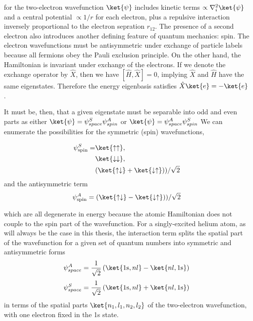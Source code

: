 	\noindent for the two-electron wavefunction $\ket{\psi}$ includes kinetic terms $\propto\nabla_i^2\ket{\psi}$ and a central potential $\propto 1/r$ for each electron, plus a repulsive interaction inversely proportional to the electron sepration $r_{12}$.
	The presence of a second electron also introduces another defining feature of quantum mechanics: spin.
	The electron wavefunctions must be antisymmetric under exchange of particle labels because all fermions obey the Pauli exclusion principle.
	On the other hand, the Hamiltonian is invariant under exchange of the electrons.
	If we denote the exchange operator by $\hat{X}$, then we have $[\hat{H},\hat{X}] = 0$, implying $\hat{X}$ and $\hat{H}$ have the same eigenstates.
	Therefore the energy eigenbasis satisfies $\hat{X}\ket{e} = -\ket{e}$.
	
	
	It must be, then, that a given eigenstate must be separable into odd and even parts as either $\ket{\psi} =  \psi^{S}_{space}\psi^{A}_{spin}$ or $\ket{\psi}=\psi^{A}_{space}\psi^{S}_{spin}$
	We can enumerate the possibilities for the symmetric (spin) wavefunctions, 
	
	\begin{align}
	\psi^S_\text{spin} =& \ket{\uparrow\uparrow},\\
		&\ket{\downarrow\downarrow},\\
		&(\ket{\uparrow\downarrow}+\ket{\downarrow\uparrow}))/\sqrt{2}
	\end{align}
	 and the antisymmetric term
	\begin{equation}
	\psi^A_\text{spin} = (\ket{\uparrow\downarrow}-\ket{\downarrow\uparrow}))/\sqrt{2}
	\end{equation}

	\noindent which are all degenerate in energy because the atomic Hamiltonian does not couple to the spin part of the wavefunction.
	For a singly-excited helium atom, as will always be the case in this thesis, the interaction term splits the spatial part of the wavefunction for a given set of quantum numbers into symmetric and antisymmetric forms
	$$
	\psi^{A}_{space} = \frac{1}{\sqrt{2}}\left(\ket{1\textrm{s},nl}  - \ket{nl,1\textrm{s}}\right)
	$$
	$$
	\psi^{S}_{space} = \frac{1}{\sqrt{2}}\left(\ket{1\textrm{s},nl} +\ket{nl,1\textrm{s}}\right)
	$$
	in terms of the spatial parts $\ket{n_1,l_1,n_2,l_2}$ of the two-electron wavefunction, with one electron fixed in the 1s state.

